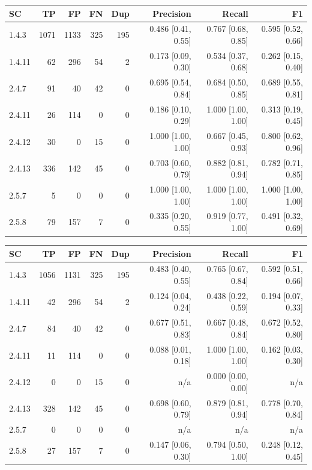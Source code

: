 \begin{tabular}{lrrrrrrr}
\hline
SC & TP & FP & FN & Dup & Precision & Recall & F1 \\
\hline
1.4.3 & 1071 & 1133 & 325 & 195 & 0.486 [0.41, 0.55] & 0.767 [0.68, 0.85] & 0.595 [0.52, 0.66] \\
1.4.11 & 62 & 296 & 54 & 2 & 0.173 [0.09, 0.30] & 0.534 [0.37, 0.68] & 0.262 [0.15, 0.40] \\
2.4.7 & 91 & 40 & 42 & 0 & 0.695 [0.54, 0.84] & 0.684 [0.50, 0.85] & 0.689 [0.55, 0.81] \\
2.4.11 & 26 & 114 & 0 & 0 & 0.186 [0.10, 0.29] & 1.000 [1.00, 1.00] & 0.313 [0.19, 0.45] \\
2.4.12 & 30 & 0 & 15 & 0 & 1.000 [1.00, 1.00] & 0.667 [0.45, 0.93] & 0.800 [0.62, 0.96] \\
2.4.13 & 336 & 142 & 45 & 0 & 0.703 [0.60, 0.79] & 0.882 [0.81, 0.94] & 0.782 [0.71, 0.85] \\
2.5.7 & 5 & 0 & 0 & 0 & 1.000 [1.00, 1.00] & 1.000 [1.00, 1.00] & 1.000 [1.00, 1.00] \\
2.5.8 & 79 & 157 & 7 & 0 & 0.335 [0.20, 0.55] & 0.919 [0.77, 1.00] & 0.491 [0.32, 0.69] \\
\hline
\end{tabular}

\begin{tabular}{lrrrrrrr}
\hline
SC & TP & FP & FN & Dup & Precision & Recall & F1 \\
\hline
1.4.3 & 1056 & 1131 & 325 & 195 & 0.483 [0.40, 0.55] & 0.765 [0.67, 0.84] & 0.592 [0.51, 0.66] \\
1.4.11 & 42 & 296 & 54 & 2 & 0.124 [0.04, 0.24] & 0.438 [0.22, 0.59] & 0.194 [0.07, 0.33] \\
2.4.7 & 84 & 40 & 42 & 0 & 0.677 [0.51, 0.83] & 0.667 [0.48, 0.84] & 0.672 [0.52, 0.80] \\
2.4.11 & 11 & 114 & 0 & 0 & 0.088 [0.01, 0.18] & 1.000 [1.00, 1.00] & 0.162 [0.03, 0.30] \\
2.4.12 & 0 & 0 & 15 & 0 & n/a & 0.000 [0.00, 0.00] & n/a \\
2.4.13 & 328 & 142 & 45 & 0 & 0.698 [0.60, 0.79] & 0.879 [0.81, 0.94] & 0.778 [0.70, 0.84] \\
2.5.7 & 0 & 0 & 0 & 0 & n/a & n/a & n/a \\
2.5.8 & 27 & 157 & 7 & 0 & 0.147 [0.06, 0.30] & 0.794 [0.50, 1.00] & 0.248 [0.12, 0.45] \\
\hline
\end{tabular}

